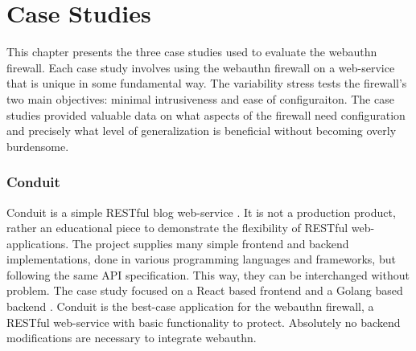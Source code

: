 

\chapter{Case Studies}

This chapter presents the three case studies used to evaluate the webauthn firewall. Each case study involves using the webauthn firewall on a web-service that is unique in some fundamental way. The variability stress tests the firewall's two main objectives: minimal intrusiveness and ease of configuraiton. The case studies provided valuable data on what aspects of the firewall need configuration and precisely what level of generalization is beneficial without becoming overly burdensome.

\subsection{Conduit}

Conduit is a simple RESTful blog web-service \cite{TODO-conduit}. It is not a production product, rather an educational piece to demonstrate the flexibility of RESTful web-applications. The project supplies many simple frontend and backend implementations, done in various programming languages and frameworks, but following the same API specification. This way, they can be interchanged without problem. The case study focused on a React based frontend \cite{TODO-Conduit-React-Frontend} and a Golang based backend \cite{TODO-Conduit-Go-Backend}. Conduit is the best-case application for the webauthn firewall, a RESTful web-service with basic functionality to protect. Absolutely no backend modifications are necessary to integrate webauthn.


